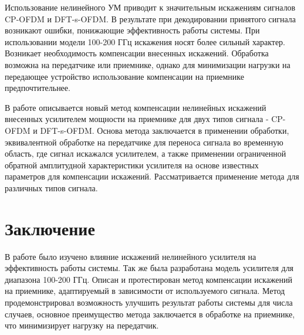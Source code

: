 \documentclass{unn}
\begin{document}
Использование нелинейного УМ приводит к значительным искажениям сигналов
CP-OFDM и DFT-s-OFDM. В результате при декодировании принятого сигнала
возникают ошибки, понижающие эффективность работы системы. При
использовании модели 100-200 ГГц искажения носят более сильный характер.
Возникает необходимость компенсации внесенных искажений. Обработка возможна
на передатчике или приемнике, однако для минимизации нагрузки на передающее
устройство использование компенсации на приемнике предпочтительнее.

В работе описывается новый метод компенсации нелинейных искажений внесенных
усилителем мощности на приемнике для двух типов сигнала - CP-OFDM и
DFT-s-OFDM. Основа метода заключается в применении обработки, эквивалентной
обработке на передатчике для переноса сигнала во временную область, где
сигнал искажался усилителем, а также применении ограниченной обратной
амплитудной характеристики усилителя на основе известных параметров для
компенсации искажений. Рассматривается применение метода для различных
типов сигнала.


\section{Заключение}
В работе было изучено влияние искажений нелинейного усилителя на
эффективность работы системы. Так же была разработана модель усилителя для
диапазона 100-200 ГГц. Описан и протестирован метод компенсации искажений
на приемнике, адаптируемый в зависимости от используемого сигнала. Метод
продемонстрировал возможность улучшить результат работы системы для числа
случаев, основное преимущество метода заключается в обработке на приемнике,
что минимизирует нагрузку на передатчик.

\newpage
{\footnotesize
\printbibliography
}
\end{document}
